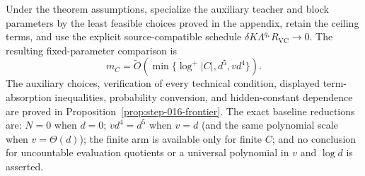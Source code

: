 \begin{corollary}\label{cor:frontier}
Under the theorem assumptions, specialize the auxiliary teacher and block
parameters by the least feasible choices proved in the appendix, retain the
ceiling terms, and use the explicit source-compatible schedule
$\delta K\Lambda^{q_*}R_{\mathrm{VC}}\to0$.  The resulting fixed-parameter
comparison is
\[
 m_C=\widetilde O\!\left(\min\{\log^+|C|,d^5,vd^4\}\right).
\]
The auxiliary choices, verification of every technical condition, displayed
term-absorption inequalities, probability conversion, and hidden-constant
dependence are proved in Proposition~\ref{prop:step-016-frontier}.
The exact baseline reductions are: $N=0$ when $d=0$; $vd^4=d^5$ when
$v=d$ (and the same polynomial scale when $v=\Theta(d)$); the finite arm is
available only for finite $C$; and no conclusion for uncountable evaluation
quotients or a universal polynomial in $v$ and $\log d$ is asserted.
\end{corollary}


